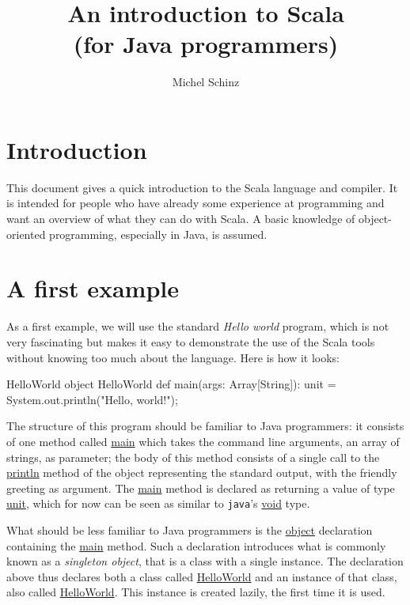 \documentclass[a4paper,12pt]{article}
\newcommand{\langname}[1]{#1\xspace}
\newcommand{\Scala}{\langname{Scala}}
\newcommand{\Java}{\langname{Java}}
\newcommand{\toolname}[1]{\texttt{#1}\xspace}
\newcommand{\java}{\toolname{java}}
\newcommand{\ident}[1]{\url{#1}\xspace}
\begin{document}
\title{An introduction to \Scala\\[.5em]\normalsize(for \Java programmers)}
\author{Michel Schinz}
\maketitle

\section{Introduction}
\label{sec:introduction}

This document gives a quick introduction to the \Scala language and
compiler. It is intended for people who have already some experience
at programming and want an overview of what they can do with \Scala. A
basic knowledge of object-oriented programming, especially in \Java,
is assumed.

\section{A first example}
\label{sec:first-example}

As a first example, we will use the standard \emph{Hello world}
program, which is not very fascinating but makes it easy to
demonstrate the use of the \Scala tools without knowing too much about
the language. Here is how it looks:
\begin{scalaprogram}{HelloWorld}
object HelloWorld {
  def main(args: Array[String]): unit = {
    System.out.println("Hello, world!");
  }
}
\end{scalaprogram}

The structure of this program should be familiar to Java programmers:
it consists of one method called \ident{main} which takes the command
line arguments, an array of strings, as parameter; the body of this
method consists of a single call to the \ident{println} method of the
object representing the standard output, with the friendly greeting as
argument. The \ident{main} method is declared as returning a value of
type \ident{unit}, which for now can be seen as similar to \java's
\ident{void} type.

What should be less familiar to Java programmers is the \ident{object}
declaration containing the \ident{main} method. Such a declaration
introduces what is commonly known as a \emph{singleton object}, that
is a class with a single instance. The declaration above thus declares
both a class called \ident{HelloWorld} and an instance of that class,
also called \ident{HelloWorld}. This instance is created lazily, the
first time it is used.
\end{document}
